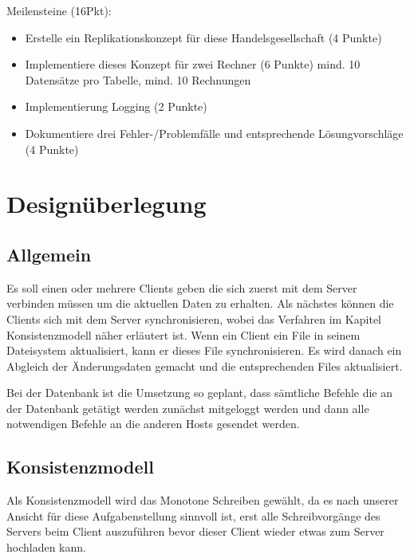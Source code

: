 \documentclass[a4paper,12pt]{scrreprt}
\begin{document}
	Meilensteine (16Pkt):
	\begin{itemize}
	\item Erstelle ein Replikationskonzept für diese Handelsgesellschaft (4 Punkte)
	\item Implementiere dieses Konzept für zwei Rechner (6 Punkte)	mind. 10 Datensätze pro Tabelle, mind. 10 Rechnungen
	\item Implementierung Logging (2 Punkte)
	\item Dokumentiere drei Fehler-/Problemfälle und entsprechende Lösungvorschläge (4 Punkte)
	\end{itemize}
\chapter{Designüberlegung}
\section{Allgemein}
Es soll einen oder mehrere Clients geben die sich zuerst mit dem Server verbinden müssen um die aktuellen Daten zu erhalten. Als nächstes können die Clients sich mit dem Server synchronisieren, wobei das Verfahren im Kapitel Konsistenzmodell näher erläutert ist. Wenn ein Client ein File in seinem Dateisystem aktualisiert, kann er dieses File synchronisieren. Es wird danach ein Abgleich der Änderungsdaten gemacht und die entsprechenden Files aktualisiert.

Bei der Datenbank ist die Umsetzung so geplant, dass sämtliche Befehle die an der Datenbank getätigt werden zunächst mitgeloggt werden und dann alle notwendigen Befehle an die anderen Hosts gesendet werden. 
\section{Konsistenzmodell}
Als Konsistenzmodell wird das Monotone Schreiben gewählt, da es nach unserer Ansicht für diese Aufgabenstellung sinnvoll ist, erst alle Schreibvorgänge des Servers beim Client auszuführen bevor dieser Client wieder etwas zum Server hochladen kann.
\end{document}
